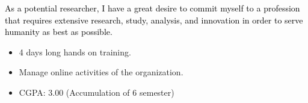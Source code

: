 \documentclass[10pt, a4paper, ragged2e, withhyper]{altacv}
\begin{document}
\begin{paracol}{2}
		
		
		
		
		\newpage
		
		\switchcolumn
		
		\begin{justify}
			\textcolor{black}{As a potential researcher, I have a great desire to commit myself to a profession that requires extensive research, study, analysis, and innovation in order to serve humanity as best as possible.}
		\end{justify}
		
		\medskip
		
		\begin{itemize}
			\item 4 days long hands on training.
			\item Manage online activities of the organization.
		\end{itemize}
		\divider
		
		\begin{itemize}
			\item CGPA: 3.00 (Accumulation of 6 semester)
		\end{itemize}
		\divider
		

\end{paracol}
\end{document}
